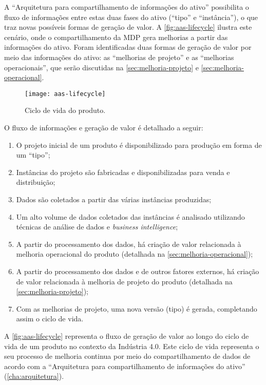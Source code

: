 A ``Arquitetura para compartilhamento de informações do ativo'' possibilita o fluxo de informações entre estas duas fases do ativo (``tipo'' e ``instância''), o que traz novas possíveis formas de geração de valor. A \autoref{fig:aas-lifecycle} ilustra este cenário, onde o compartilhamento da MDP gera melhorias a partir das informações do ativo. Foram identificadas duas formas de geração de valor por meio das informações do ativo: as ``melhorias de projeto'' e as ``melhorias operacionais'', que serão discutidas na \autoref{sec:melhoria-projeto} e \autoref{sec:melhoria-operacional}.

\begin{figure}[htb!]
	\centering
	\texttt{[image: aas-lifecycle]}
	\caption{Ciclo de vida do produto.}
	\label{fig:aas-lifecycle}
\end{figure}

O fluxo de informações e geração de valor é detalhado a seguir:

\begin{enumerate}[label=(\alph*)]
	\item O projeto inicial de um produto é disponibilizado para produção em forma de um ``tipo'';
	\item Instâncias do projeto são fabricadas e disponibilizadas para venda e distribuição;
	\item Dados são coletados a partir das várias instâncias produzidas;
	\item Um alto volume de dados coletados das instâncias é analisado utilizando técnicas de análise de dados e \textit{business intelligence};
	\item A partir do processamento dos dados, há criação de valor relacionada à melhoria operacional do produto (detalhada na \autoref{sec:melhoria-operacional});
	\item A partir do processamento dos dados e de outros fatores externos, há criação de valor relacionada à melhoria de projeto do produto (detalhada na \autoref{sec:melhoria-projeto});
	\item Com as melhorias de projeto, uma nova versão (tipo) é gerada, completando assim o ciclo de vida.
\end{enumerate}

A \autoref{fig:aas-lifecycle} representa o fluxo de geração de valor ao longo do ciclo de vida de um produto no contexto da Indústria 4.0. Este ciclo de vida representa o seu processo de melhoria continua por meio do compartilhamento de dados de acordo com a ``Arquitetura para compartilhamento de informações do ativo'' (\autoref{cha:arquitetura}).

